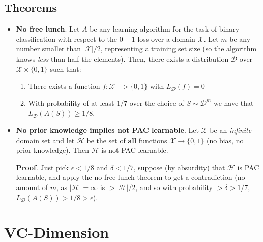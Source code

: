 \documentclass[../template.tex]{subfiles}
\begin{document}
\subsection{Theorems}
\begin{itemize}
    \item \textbf{No free lunch}. Let $A$ be any learning algorithm for the task of binary classification with respect to the $0-1$ loss over a domain $\mathcal{X}$. Let $m$ be any number smaller than $|\mathcal{X}|/2$, representing a training set size (so the algorithm knows \textit{less} than half the elements). Then, there exists a distribution $\mathcal{D}$ over $\mathcal{X}\times \{0,1\}$ such that: 
    \begin{enumerate}
        \item There exists a function $f \colon \mathcal{X}-> \{0,1\}$ with $L_{\mathcal{D}} (f) = 0$
        \item With probability of at least $1/7$ over the choice of $S \sim \mathcal{D}^m$ we have that $L_{\mathcal{D}}(A(S)) \geq 1/8$.  
    \end{enumerate}
    \item \textbf{No prior knowledge implies not PAC learnable}. Let $\mathcal{X}$ be an \textit{infinite} domain set and let $\mathcal{H}$ be the set of \textbf{all} functions $\mathcal{X} \to \{0,1\}$ (no bias, no prior knowledge). Then $\mathcal{H}$ is not PAC learnable.  
    \medskip

    \textbf{Proof}. Just pick $\epsilon < 1/8$ and $\delta < 1/7$, suppose (by absurdity) that $\mathcal{H}$ is PAC learnable, and apply the no-free-lunch theorem to get a contradiction (no amount of $m$, as $|\mathcal{H}| = \infty$ is $> |\mathcal{H}|/2$, and so with probability $> \delta > 1/7$, $L_{\mathcal{D}}(A(S)) > 1/8 > \epsilon$). 
\end{itemize}

\section{VC-Dimension}
\end{document}
